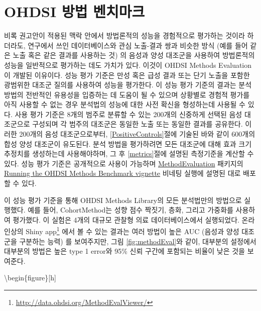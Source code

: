 \documentclass[11pt]{book}
\let\rmarkdownfootnote\footnote%
\def\footnote{\protect\rmarkdownfootnote}
\theoremstyle{definition}
\theoremstyle{definition}
\theoremstyle{definition}
\theoremstyle{remark}
\begin{document}
\section{OHDSI 방법 벤치마크}\label{ohdsi--}


비록 권고안이 적용된 맥락 안에서 방법론적의 성능을 경험적으로 평가하는
것이라 하더라도, 연구에서 쓰인 데이터베이스와 관심 노출-결과 쌍과 비슷한
방식 (예를 들어 같은 노출 혹은 같은 결과를 사용하는 것) 의 음성과 양성
대조군을 사용하여 방법론적의 성능을 일반적으로 평가하는 데도 가치가
있다. 이것이 OHDSI Methods Evaluation이 개발된 이유이다. 성능 평가
기준은 만성 혹은 급성 결과 또는 단기 노출을 포함한 광범위한 대조군
질의를 사용하여 성능을 평가한다. 이 성능 평가 기준의 결과는 분석 방법의
전반적인 유용성을 입증하는 데 도움이 될 수 있으며 상황별로 경험적 평가를
아직 사용할 수 없는 경우 분석법의 성능에 대한 사전 확신을 형성하는데
사용될 수 있다. 사용 평가 기준은 8개의 범주로 분류할 수 있는 200개의
신중하게 선택된 음성 대조군으로 구성되며 각 범주의 대조군은 동일한 노출
또는 동일한 결과를 공유한다. 이러한 200개의 음성 대조군으로부터,
\ref{PositiveControls}절에 기술된 바와 같이 600개의 합성 양성 대조군이
유도된다. 분석 방법을 평가하려면 모든 대조군에 대해 효과 크기 추정치를
생성하는데 사용해야하며, 그 후 \ref{metrics}절에 설명된 측정기준을
계산할 수 있다. 성능 평가 기준은 공개적으로 사용이 가능하며
\href{https://ohdsi.github.io/MethodEvaluation/}{MethodEvaluation}
패키지의
\href{https://ohdsi.github.io/MethodEvaluation/articles/OhdsiMethodsBenchmark.html}{Running
the OHDSI Methods Benchmark vignette} 비네팅 실행에 설명된 대로 배포할
수 있다.

이 성능 평가 기준을 통해 OHDSI Methods Library의 모든 분석법만의
방법으로 실행했다. 예를 들어, CohortMethod는 성향 점수 짝짓기, 층화,
그리고 가중화를 사용하여 평가했다. 이 실험은 4개의 대규모 관찰형 의료
데이터베이스에서 실행되었다. 온라인상의 Shiny app\footnote{\url{http://data.ohdsi.org/MethodEvalViewer/}}
에서 볼 수 있는 결과는 여러 방법이 높은 AUC (음성과 양성 대조군을
구분하는 능력) 를 보여주지만, 그림 \ref{fig:methodEval}와 같이, 대부분의
설정에서 대부분의 방법은 높은 type 1 error와 95\% 신뢰 구간에 포함되는
비율이 낮은 것을 보여준다.

\textbackslash{}begin\{figure\}{[}h{]}
\end{document}
